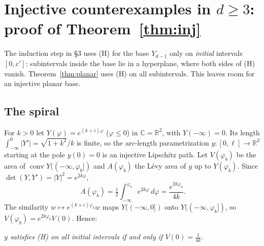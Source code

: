 \documentclass[11pt]{amsart}
\theoremstyle{definition}
\newcommand{\R}{\mathbb{R}}
\newcommand{\conv}{\operatorname{conv}}
\newcommand{\C}{\mathbb{C}}
\begin{document}
\section{Injective counterexamples in $d\ge3$: proof of Theorem~\ref{thm:inj}}

The induction step in \S3 uses (H) for the base $Y_{d-1}$ only on \emph{initial} intervals $[0,c']$: subintervals inside the base lie in a hyperplane, where both sides
of (H) vanish. Theorem~\ref{thm:planar} uses (H) on all subintervals. This leaves room for an injective planar base.

\subsection*{The spiral}
For $k>0$ let $Y(\varphi)=e^{(k+i)\varphi}$ ($\varphi\le0$) in $\C=\R^2$, with $Y(-\infty)=0$. Its length $\int_{-\infty}^0|Y'|=\sqrt{1+k^2}/k$ is finite, so the arc-length
parametrization $y:[0,\ell]\to\R^2$ starting at the pole $y(0)=0$ is an injective Lipschitz path. Let $V(\varphi_b)$ be the area of $\conv Y((-\infty,\varphi_b])$ and $A(\varphi_b)$ the
L\'evy area of $y$ up to $Y(\varphi_b)$. Since $\det(Y,Y')=|Y|^2=e^{2k\varphi}$,
\[
A(\varphi_b)=\tfrac12\int_{-\infty}^{\varphi_b}e^{2k\varphi}\,d\varphi=\frac{e^{2k\varphi_b}}{4k}.
\]
The similarity $w\mapsto e^{(k+i)\varphi_b}w$ maps $Y((-\infty,0])$ onto $Y((-\infty,\varphi_b])$, so $V(\varphi_b)=e^{2k\varphi_b}V(0)$. Hence:

\emph{$y$ satisfies (H) on all initial intervals if and only if $V(0)=\frac1{4k}$.}
\end{document}
